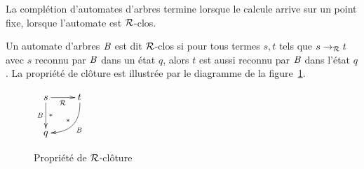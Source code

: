 




La complétion d'automates d'arbres termine lorsque le calcule arrive sur un point fixe,
lorsque l'automate est $\mathcal R$-clos.


\begin{definition}
  Un automate d'arbres $\mathit B$ est dit $\mathcal R$-clos si pour tous termes $s,t$ tels que 
  $s \rightarrow_\mathcal R t$ avec $s$ reconnu par $\mathit B$ dans un état $q$, alors $t$ est aussi reconnu par $\mathit B$ dans l'état $q$.
  La propriété de clôture est illustrée par le diagramme de la figure~\ref{fig:R-cloture}.
  \begin{figure}[ht!]
    \centering
    $
    \xymatrix{
      s \ar[r]_{\R}\ar[d]^{*}_{\B} & t \ar@/^1.2pc/[ld]_{*}^{\B}\\
      q & %
    }
    $
    \caption{\footnotesize Propriété de $\mathcal R$-clôture}
    \label{fig:R-cloture}
  \end{figure}
\end{definition}

